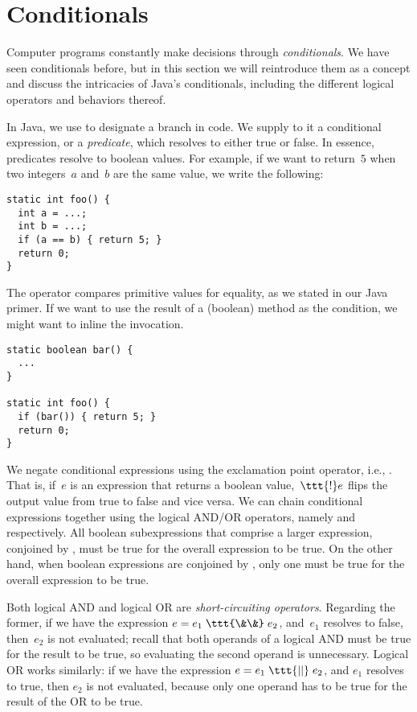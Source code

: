 \section{Conditionals}

Computer programs constantly make decisions through \emph{conditionals}. 
We have seen conditionals before, but in this section we will reintroduce them as a concept and discuss the intricacies of Java's conditionals, including the different logical operators and behaviors thereof.

In Java, we use  to designate a branch in code. 
We supply to it a conditional expression, or a \emph{predicate}, which resolves to either true or false. 
In essence, predicates resolve to boolean values. 
For example, if we want to return~$5$ when two integers~$a$ and~$b$ are the same value, we write the following:

\begin{lstlisting}[language=MyJava]
static int foo() {
  int a = ...;
  int b = ...;
  if (a == b) { return 5; }
  return 0;
}
\end{lstlisting}

The \ttt{==} operator compares primitive values for equality, as we stated in our Java primer. 
If we want to use the result of a (boolean) method as the condition, we might want to inline the invocation. 

\begin{lstlisting}[language=MyJava]
static boolean bar() {
  ...
}

static int foo() {
  if (bar()) { return 5; }
  return 0;
}
\end{lstlisting}

We negate conditional expressions using the exclamation point operator, i.e., \ttt{!}. 
That is, if~$e$ is an expression that returns a boolean value,~$\ttt{!}e$ flips the output value from true to false and vice versa. 
We can chain conditional expressions together using the logical AND/OR operators, namely \ttt{\&\&} and \ttt{||} respectively. 
All boolean subexpressions that comprise a larger expression, conjoined by \ttt{\&\&}, must be true for the overall expression to be true. 
On the other hand, when boolean expressions are conjoined by \ttt{||}, only one must be true for the overall expression to be true. 

Both logical AND and logical OR are \emph{short-circuiting operators}. 
Regarding the former, if we have the expression $e = e_1 \;\ttt{\&\&}\;e_2$, and~$e_1$ resolves to false, then~$e_2$ is not evaluated; recall that both operands of a logical AND must be true for the result to be true, so evaluating the second operand is unnecessary.
Logical OR works similarly: if we have the expression $e = e_1\;\ttt{||}\;e_2$, and $e_1$ resolves to true, then $e_2$ is not evaluated, because only one operand has to be true for the result of the OR to be true.

